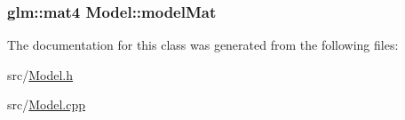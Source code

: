 \subsubsection[{\texorpdfstring{model\+Mat}{modelMat}}]{\setlength{\rightskip}{0pt plus 5cm}glm\+::mat4 Model\+::model\+Mat\hspace{0.3cm}{\ttfamily [protected]}}\hypertarget{class_model_ad822f014d9b52f776d888b282d1924df}{}\label{class_model_ad822f014d9b52f776d888b282d1924df}


The documentation for this class was generated from the following files\+:\begin{DoxyCompactItemize}
\item 
src/\hyperlink{_model_8h}{Model.\+h}\item 
src/\hyperlink{_model_8cpp}{Model.\+cpp}\end{DoxyCompactItemize}
